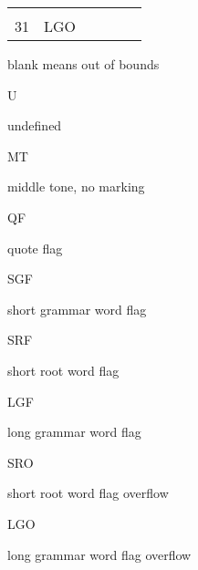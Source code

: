 \begin{longtable}[c]{@{}llllll@{}}
\begin{minipage}[t]{0.14\columnwidth}\raggedright\strut
\strut\end{minipage} &
\begin{minipage}[t]{0.14\columnwidth}\raggedright\strut
\strut\end{minipage} &
\begin{minipage}[t]{0.14\columnwidth}\raggedright\strut
\strut\end{minipage}\tabularnewline
\begin{minipage}[t]{0.14\columnwidth}\raggedright\strut
31
\strut\end{minipage} &
\begin{minipage}[t]{0.14\columnwidth}\raggedright\strut
LGO
\strut\end{minipage} &
\begin{minipage}[t]{0.14\columnwidth}\raggedright\strut
\strut\end{minipage} &
\begin{minipage}[t]{0.14\columnwidth}\raggedright\strut
\strut\end{minipage} &
\begin{minipage}[t]{0.14\columnwidth}\raggedright\strut
\strut\end{minipage} &
\begin{minipage}[t]{0.14\columnwidth}\raggedright\strut
\strut\end{minipage}\tabularnewline
\bottomrule
\end{longtable}

blank means out of bounds

U

undefined

MT

middle tone, no marking

QF

quote flag

SGF

short grammar word flag

SRF

short root word flag

LGF

long grammar word flag

SRO

short root word flag overflow

LGO

long grammar word flag overflow
